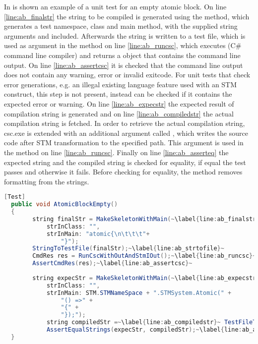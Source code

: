 In  is shown an example of a unit test for an empty atomic block. On line \ref{line:ab_finalstr} the string  to be compiled is generated using the  method, which generates a test namespace, class and main method, with the supplied string arguments  and  included. Afterwards the string is written to a test file, which is used as argument in the method on line \ref{line:ab_runcsc}, which executes  (C\# command line compiler) and returns a  object that contains the command line output. On line \ref{line:ab_assertcsc} it is checked that the command line output does not contain any warning, error or invalid exitcode. For unit tests that check error generations, e.g. an illegal existing language feature used with an \ac{STM} construct, this step is not present, instead  can be checked if it contains the expected error or warning. On line \ref{line:ab_expecstr} the expected result of compilation string  is generated and on line \ref{line:ab_compiledstr} the actual compilation string  is fetched. In order to retrieve the actual compilation string, csc.exe is extended with an additional argument called , which writes the source code after \ac{STM} transformation to the specified path. This argument is used in the method on line \ref{line:ab_runcsc}. Finally on line \ref{line:ab_asserteq} the expected string and the compiled string is checked for equality, if equal the test passes and otherwise it fails. Before checking for equality, the  method removes formatting from the strings.

\begin{lstlisting}[label=lst:empty_atomic_block,
  caption={Empty Atomic Block Unit Test},
  language=Java,  
  showspaces=false,
  showtabs=false,
  breaklines=true,
  showstringspaces=false,
  breakatwhitespace=true,
  escapechar=~,
  commentstyle=\color{greencomments},
  keywordstyle=\color{bluekeywords},
  stringstyle=\color{redstrings},
  morekeywords={atomic, retry, orelse, var, get, set, ref, out, Test}]  % Start your code-block
  [Test]
  public void AtomicBlockEmpty()
  {
  		string finalStr = MakeSkeletonWithMain(~\label{line:ab_finalstr}~
  			strInClass: "",
  			strInMain: "atomic{\n\t\t\t"+ 
  				"}");
  		StringToTestFile(finalStr);~\label{line:ab_strtofile}~
  		CmdRes res = RunCscWithOutAndStmIOut();~\label{line:ab_runcsc}~
  		AssertCmdRes(res);~\label{line:ab_assertcsc}~
  		
  		string expecStr = MakeSkeletonWithMain(~\label{line:ab_expecstr}~
  			strInClass: "",
  			strInMain: STM.STMNameSpace + ".STMSystem.Atomic(" +
  				"() =>" +
  				"{" +
  				"});");
			string compiledStr =~\label{line:ab_compiledstr}~ TestFileToString(currentCompiledCsFile);
			AssertEqualStrings(expecStr, compiledStr);~\label{line:ab_asserteq}~
  }
\end{lstlisting}

